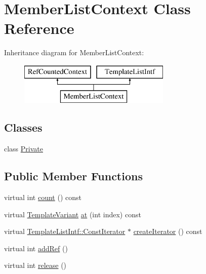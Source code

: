 \hypertarget{class_member_list_context}{}\section{Member\+List\+Context Class Reference}
\label{class_member_list_context}
Inheritance diagram for Member\+List\+Context\+:\begin{figure}[H]
\begin{center}
\leavevmode
\includegraphics[height=2.000000cm]{class_member_list_context}
\end{center}
\end{figure}
\subsection*{Classes}
\begin{DoxyCompactItemize}
\item 
class \mbox{\hyperlink{class_member_list_context_1_1_private}{Private}}
\end{DoxyCompactItemize}
\subsection*{Public Member Functions}
\begin{DoxyCompactItemize}
\item 
virtual int \mbox{\hyperlink{class_member_list_context_a1d77ef2461ae73437323716e0c7a9705}{count}} () const
\item 
virtual \mbox{\hyperlink{class_template_variant}{Template\+Variant}} \mbox{\hyperlink{class_member_list_context_a89dbead5ee65a69041998b3f58a9cf30}{at}} (int index) const
\item 
virtual \mbox{\hyperlink{class_template_list_intf_1_1_const_iterator}{Template\+List\+Intf\+::\+Const\+Iterator}} $\ast$ \mbox{\hyperlink{class_member_list_context_af9e965557d0f61f3634cca3ba13c9524}{create\+Iterator}} () const
\item 
virtual int \mbox{\hyperlink{class_member_list_context_a2ee8c2892871175c21a47ae4aaed9218}{add\+Ref}} ()
\item 
virtual int \mbox{\hyperlink{class_member_list_context_ada9f462753c6425d2912cd4cb02d4285}{release}} ()
\end{DoxyCompactItemize}
